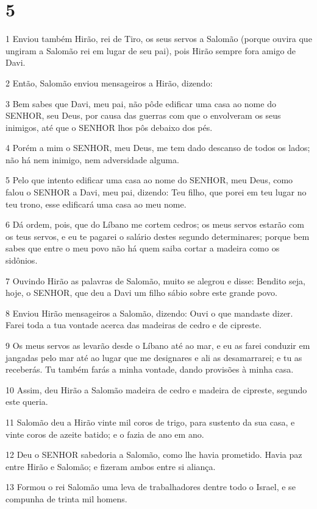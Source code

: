 \chapter{5}

\par 1 Enviou também Hirão, rei de Tiro, os seus servos a Salomão (porque ouvira que ungiram a Salomão rei em lugar de seu pai), pois Hirão sempre fora amigo de Davi.
\par 2 Então, Salomão enviou mensageiros a Hirão, dizendo:
\par 3 Bem sabes que Davi, meu pai, não pôde edificar uma casa ao nome do SENHOR, seu Deus, por causa das guerras com que o envolveram os seus inimigos, até que o SENHOR lhos pôs debaixo dos pés.
\par 4 Porém a mim o SENHOR, meu Deus, me tem dado descanso de todos os lados; não há nem inimigo, nem adversidade alguma.
\par 5 Pelo que intento edificar uma casa ao nome do SENHOR, meu Deus, como falou o SENHOR a Davi, meu pai, dizendo: Teu filho, que porei em teu lugar no teu trono, esse edificará uma casa ao meu nome.
\par 6 Dá ordem, pois, que do Líbano me cortem cedros; os meus servos estarão com os teus servos, e eu te pagarei o salário destes segundo determinares; porque bem sabes que entre o meu povo não há quem saiba cortar a madeira como os sidônios.
\par 7 Ouvindo Hirão as palavras de Salomão, muito se alegrou e disse: Bendito seja, hoje, o SENHOR, que deu a Davi um filho sábio sobre este grande povo.
\par 8 Enviou Hirão mensageiros a Salomão, dizendo: Ouvi o que mandaste dizer. Farei toda a tua vontade acerca das madeiras de cedro e de cipreste.
\par 9 Os meus servos as levarão desde o Líbano até ao mar, e eu as farei conduzir em jangadas pelo mar até ao lugar que me designares e ali as desamarrarei; e tu as receberás. Tu também farás a minha vontade, dando provisões à minha casa.
\par 10 Assim, deu Hirão a Salomão madeira de cedro e madeira de cipreste, segundo este queria.
\par 11 Salomão deu a Hirão vinte mil coros de trigo, para sustento da sua casa, e vinte coros de azeite batido; e o fazia de ano em ano.
\par 12 Deu o SENHOR sabedoria a Salomão, como lhe havia prometido. Havia paz entre Hirão e Salomão; e fizeram ambos entre si aliança.
\par 13 Formou o rei Salomão uma leva de trabalhadores dentre todo o Israel, e se compunha de trinta mil homens.
